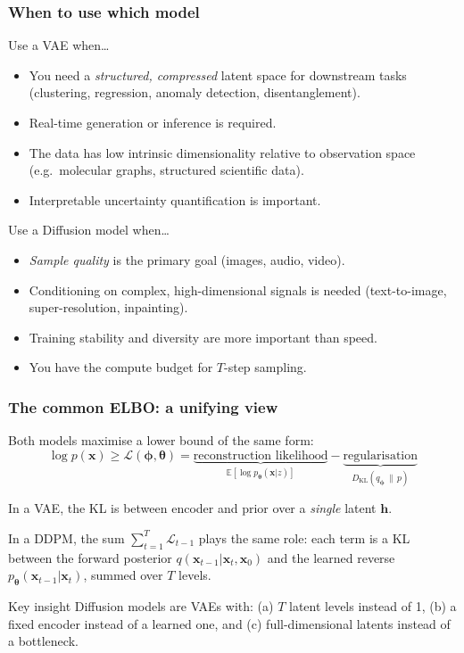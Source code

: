 \documentclass{beamer}
\newcommand{\E}{\mathbb{E}}
\newcommand{\DKL}{D_{\mathrm{KL}}}
\newcommand{\ELBO}{\mathcal{L}}
\begin{document}
\begin{frame}
\frametitle{When to use which model}

\begin{block}{Use a VAE when\ldots}
\begin{itemize}
  \item You need a \emph{structured, compressed} latent space for downstream tasks
        (clustering, regression, anomaly detection, disentanglement).
  \item Real-time generation or inference is required.
  \item The data has low intrinsic dimensionality relative to observation space
        (e.g.\ molecular graphs, structured scientific data).
  \item Interpretable uncertainty quantification is important.
\end{itemize}
\end{block}

\begin{block}{Use a Diffusion model when\ldots}
\begin{itemize}
  \item \emph{Sample quality} is the primary goal (images, audio, video).
  \item Conditioning on complex, high-dimensional signals is needed
        (text-to-image, super-resolution, inpainting).
  \item Training stability and diversity are more important than speed.
  \item You have the compute budget for $T$-step sampling.
\end{itemize}
\end{block}
\end{frame}

\begin{frame}
\frametitle{The common ELBO: a unifying view}

Both models maximise a lower bound of the same form:
\[
  \log p(\bm{x}) \geq \ELBO(\bm{\phi},\bm{\theta})
  = \underbrace{\text{reconstruction likelihood}}_{\E[\log p_{\bm{\theta}}(\bm{x}|z)]}
  - \underbrace{\text{regularisation}}_{\DKL(q_{\bm{\phi}}\,\|\,p)}
\]

In a VAE, the KL is between encoder and prior over a \emph{single} latent $\bm{h}$.

In a DDPM, the sum $\sum_{t=1}^{T}\mathcal{L}_{t-1}$ plays the same role:
each term is a KL between the forward posterior $q(\bm{x}_{t-1}|\bm{x}_t,\bm{x}_0)$
and the learned reverse $p_{\bm{\theta}}(\bm{x}_{t-1}|\bm{x}_t)$, summed over
$T$ levels.

\begin{block}{Key insight}
Diffusion models are VAEs with:
(a) $T$ latent levels instead of 1,
(b) a fixed encoder instead of a learned one, and
(c) full-dimensional latents instead of a bottleneck.
\end{block}
\end{frame}
\end{document}
